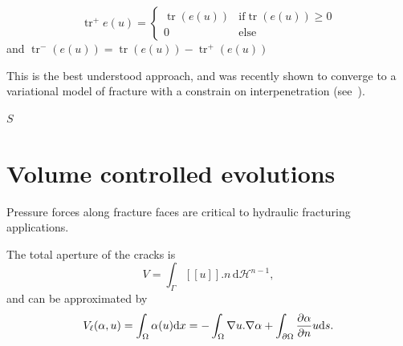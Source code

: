 \documentclass[10pt,oneside]{report}
\def\vDefP{{\texttt{vDefP}} }
\let\div\relax
\DeclareMathOperator*{\div}{div}
\DeclareMathOperator{\tr}{tr}
\newcommand{\jump}[1]{\ensuremath{[\![#1]\!]} }
\begin{document}
\begin{equation}
\tr^+ e(u) = \left\{
    \begin{array}{ll}
         \tr{(e(u))}  & \mbox{if}  \tr{(e(u))} \geq 0  \\
        0 & \mbox{else}
    \end{array}
\right.
\end{equation}
and $\tr ^-({e(u)}) = \tr({e(u)}) - \tr ^+({e(u)})$

This is the best understood approach, and was recently shown to converge to a variational model of fracture with a constrain on interpenetration (see~\cite{Chambolle-Conti-EtAl-2017a}).




$S$ 

\section{Volume controlled evolutions}

Pressure forces along fracture faces are critical to hydraulic fracturing applications.

The total aperture of the cracks is
$$ V = \int_{\Gamma} \jump{u} .n\, \mathrm{d}\mathcal{H}^{n-1},$$
and can be approximated by
$$ V_{\ell}(\alpha,u)=\int_{\Omega} \alpha \div{(u)} \mathrm{d}x= - \int_{\Omega} \nabla u . \nabla \alpha + \int_{\partial \Omega} \frac{\partial \alpha}{\partial n} u \mathrm{d}s.$$
\end{document}
